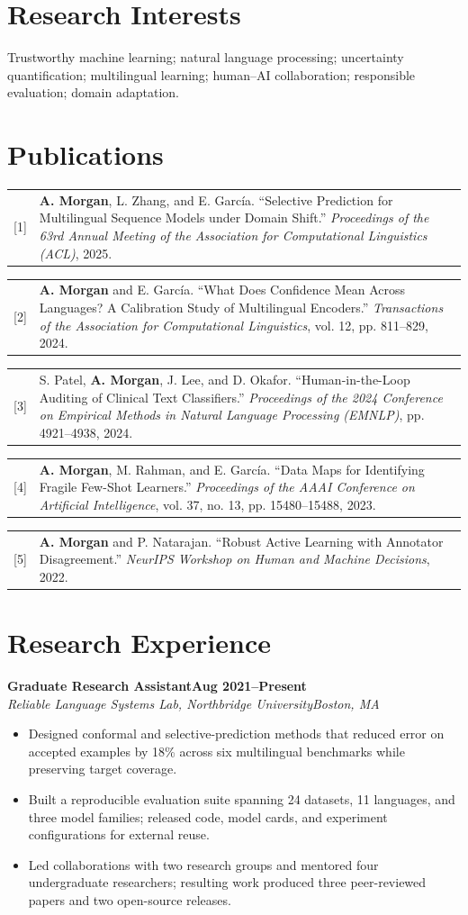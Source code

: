 \documentclass[10pt,letterpaper]{article}
\makeatletter
\newcommand{\cventry}[4]{%
  \textbf{#1}\hfill\textbf{#2}\\[-1pt]
  \textit{#3}\hfill\textit{#4}\par
}
\newcommand{\publication}[2]{%
  \begin{tabularx}{\textwidth}{@{}p{1.75em}X@{}}
    #1 & #2
  \end{tabularx}\par
}
\makeatother
\begin{document}
\section*{Research Interests}
Trustworthy machine learning; natural language processing; uncertainty quantification; multilingual
learning; human--AI collaboration; responsible evaluation; domain adaptation.

\section*{Publications}
\small
\publication{[1]}{\textbf{A. Morgan}, L. Zhang, and E. García. ``Selective Prediction for Multilingual
Sequence Models under Domain Shift.'' \textit{Proceedings of the 63rd Annual Meeting of the
Association for Computational Linguistics (ACL)}, 2025.}

\publication{[2]}{\textbf{A. Morgan} and E. García. ``What Does Confidence Mean Across Languages?
A Calibration Study of Multilingual Encoders.'' \textit{Transactions of the Association for
Computational Linguistics}, vol. 12, pp. 811--829, 2024.}

\publication{[3]}{S. Patel, \textbf{A. Morgan}, J. Lee, and D. Okafor. ``Human-in-the-Loop Auditing of
Clinical Text Classifiers.'' \textit{Proceedings of the 2024 Conference on Empirical Methods in
Natural Language Processing (EMNLP)}, pp. 4921--4938, 2024.}

\publication{[4]}{\textbf{A. Morgan}, M. Rahman, and E. García. ``Data Maps for Identifying Fragile
Few-Shot Learners.'' \textit{Proceedings of the AAAI Conference on Artificial Intelligence},
vol. 37, no. 13, pp. 15480--15488, 2023.}

\publication{[5]}{\textbf{A. Morgan} and P. Natarajan. ``Robust Active Learning with Annotator
Disagreement.'' \textit{NeurIPS Workshop on Human and Machine Decisions}, 2022.}
\normalsize

\section*{Research Experience}
\cventry{Graduate Research Assistant}{Aug 2021--Present}{Reliable Language Systems Lab, Northbridge University}{Boston, MA}
\begin{itemize}
  \item Designed conformal and selective-prediction methods that reduced error on accepted examples
        by 18\% across six multilingual benchmarks while preserving target coverage.
  \item Built a reproducible evaluation suite spanning 24 datasets, 11 languages, and three model
        families; released code, model cards, and experiment configurations for external reuse.
  \item Led collaborations with two research groups and mentored four undergraduate researchers;
        resulting work produced three peer-reviewed papers and two open-source releases.
\end{itemize}
\end{document}
